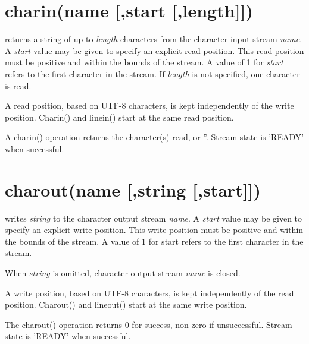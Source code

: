 \label{refrexxstream}


\section{charin(name [,start [,length{]}{]})}
returns a string of up to \emph{length} characters from
the character input stream  \emph{name}. A \emph{start} value may be given to specify
an explicit read position. This read position must be positive and within
the bounds of the stream. A value of 1 for \emph{start} refers to the first character in the stream.
If \emph{length} is not specified, one character is read.

A read position, based on UTF-8 characters, is kept independently of the write position.
Charin() and linein() start at the same read position.

A charin() operation returns the character(s) read, or ''. Stream state is 'READY' when successful.

\section{charout(name [,string [,start{]}{]})}
writes \emph{string} to the character output stream \emph{name}. A \emph{start} value may be given
to specify an explicit write position. This write position must be positive and within the
bounds of the stream. A value of 1 for start refers to the first character in the stream.

When \emph{string} is omitted, character output stream \emph{name} is closed.

A write position, based on UTF-8 characters, is kept independently of the read position.
Charout() and lineout() start at the same write position.

The charout() operation returns 0 for success, non-zero if unsuccessful. Stream state is 'READY' when successful.

